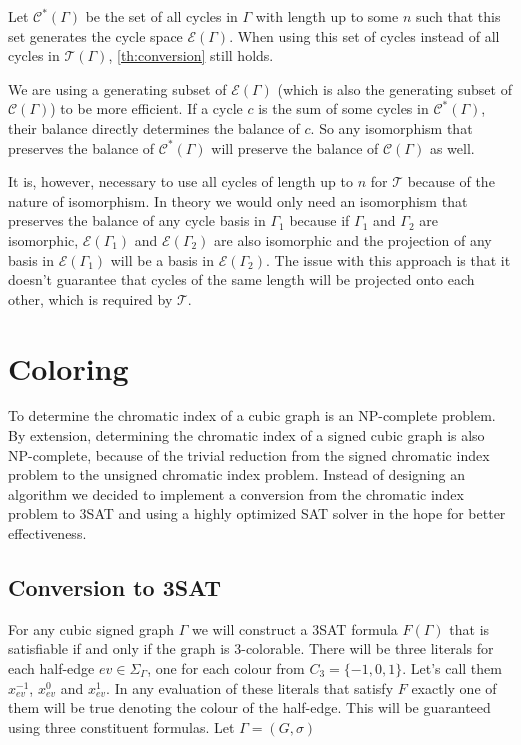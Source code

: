 \begin{lemma}\label{lem:genset}
    Let $\mathcal{C} ^* (\Gamma)$ be the set of all cycles in $\Gamma$ with length up to some $n$ such that this set generates the cycle space $\mathcal{E} (\Gamma)$. When using this set of cycles instead of all cycles in $\mathcal{T} (\Gamma)$, \cref{th:conversion} still holds.
\end{lemma}

We are using a generating subset of $\mathcal{E} (\Gamma)$ (which is also the generating subset of $\mathcal{C} (\Gamma)$) to be more efficient. If a cycle $c$ is the sum of some cycles in $\mathcal{C} ^* (\Gamma)$, their balance directly determines the balance of $c$. So any isomorphism that preserves the balance of $\mathcal{C} ^* (\Gamma)$ will preserve the balance of $\mathcal{C} (\Gamma)$ as well.

It is, however, necessary to use all cycles of length up to $n$ for $\mathcal{T}$ because of the nature of isomorphism. In theory we would only need an isomorphism that preserves the balance of any cycle basis in $\Gamma _1$ because if $\Gamma _1$ and $\Gamma _2$ are isomorphic, $\mathcal{E} (\Gamma _1)$ and $\mathcal{E} (\Gamma _2)$ are also isomorphic and the projection of any basis in $\mathcal{E} (\Gamma _1)$ will be a basis in $\mathcal{E} (\Gamma _2)$. The issue with this approach is that it doesn't guarantee that cycles of the same length will be projected onto each other, which is required by $\mathcal{T}$.

\section{Coloring}

To determine the chromatic index of a cubic graph is an NP-complete problem. By extension, determining the chromatic index of a signed cubic graph is also NP-complete, because of the trivial reduction from the signed chromatic index problem to the unsigned chromatic index problem. Instead of designing an algorithm we decided to implement a conversion from the chromatic index problem to 3SAT and using a highly optimized SAT solver in the hope for better effectiveness.

\subsection{Conversion to 3SAT}

For any cubic signed graph $\Gamma$ we will construct a 3SAT formula $F(\Gamma)$ that is satisfiable if and only if the graph is 3-colorable. There will be three literals for each half-edge $ev \in \Sigma _{\Gamma}$, one for each colour from $C_3 = \{-1, 0, 1\}$. Let's call them $x^{-1}_{ev}$, $x^{0}_{ev}$ and $x^{1}_{ev}$. In any evaluation of these literals that satisfy $F$ exactly one of them will be true denoting the colour of the half-edge. This will be guaranteed using three constituent formulas. Let $\Gamma = (G, \sigma)$

